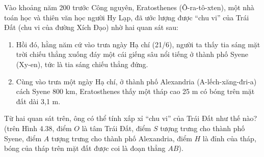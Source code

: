 \begin{exercises}
\begin{questions}[resume=SGK]
        Vào khoảng năm 200 trước Công nguyên, Eratosthenes (Ô-ra-tô-xten), một nhà toán học và thiên văn học người Hy Lạp, đã ước lượng được “chu vi” của Trái Đất (chu vi của đường Xích Đạo) nhờ hai quan sát sau:
        \begin{enumerate}[label=\arabic*.]
            \item Hồi đó, hằng năm cứ vào trưa ngày Hạ chí (21/6), người ta thấy tia sáng mặt trời chiếu thẳng xuống đáy một cái giếng sâu nổi tiếng ở thành phố Syene (Xy-en), tức là tia sáng chiếu thẳng đứng.
            \item Cùng vào trưa một ngày Hạ chí, ở thành phố Alexandria (A-lếch-xăng-đri-a) cách Syene 800 km, Eratosthenes thấy một tháp cao 25 m có bóng trên mặt đất dài 3,1 m.
        \end{enumerate}

        Từ hai quan sát trên, ông có thể tính xấp xỉ “chu vi” của Trái Đất như thế nào? (trên Hình 4.38, điểm $O$ là tâm Trái Đất, điểm $S$ tượng trưng cho thành phố Syene, điểm $A$ tượng trưng cho thành phố Alexandria, điểm $H$ là đỉnh của tháp, bóng của tháp trên mặt đất được coi là đoạn thẳng $AB$).

        \begin{center}
        \end{center}

        \answerline
        \answerline
        \answerline
        \answerline
    \end{questions}
\end{exercises}

